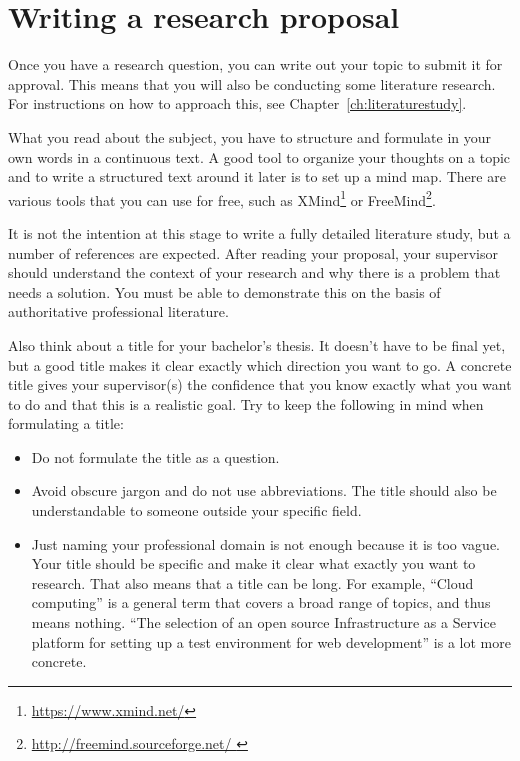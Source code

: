 \section{Writing a research proposal}
\label{sec:researchproposal}

Once you have a research question, you can write out your topic to submit it for approval. This means that you will also be conducting some literature research. For instructions on how to approach this, see Chapter~\ref{ch:literaturestudy}.

What you read about the subject, you have to structure and formulate in your own words in a continuous text. A good tool to organize your thoughts on a topic and to write a structured text around it later is to set up a mind map. There are various tools that you can use for free, such as XMind\footnote{\url{https://www.xmind.net/}} or FreeMind\footnote{\url{http://freemind.sourceforge.net/ }}.


It is not the intention at this stage to write a fully detailed literature study, but a number of references are expected. After reading your proposal, your supervisor should understand the context of your research and why there is a problem that needs a solution. You must be able to demonstrate this on the basis of authoritative professional literature.

Also think about a title for your bachelor's thesis. It doesn't have to be final yet, but a good title makes it clear exactly which direction you want to go. A concrete title gives your supervisor(s) the confidence that you know exactly what you want to do and that this is a realistic goal. Try to keep the following in mind when formulating a title:

\begin{itemize}
    \item Do not formulate the title as a question.
    \item Avoid obscure jargon and do not use abbreviations. The title should also be understandable to someone outside your specific field.
    \item Just naming your professional domain is not enough because it is too vague. Your title should be specific and make it clear what exactly you want to research. That also means that a title can be long. For example, ``Cloud computing'' is a general term that covers a broad range of topics, and thus means nothing. ``The selection of an open source Infrastructure as a Service platform for setting up a test environment for web development'' is a lot more concrete.  
\end{itemize}

